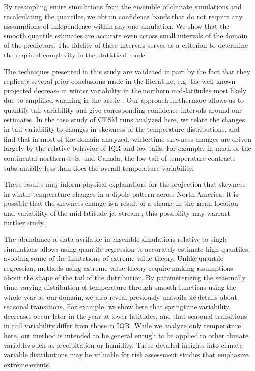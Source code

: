 \documentclass{ametsoc}
\begin{document}
By resampling entire simulations from the ensemble of climate simulations and recalculating the quantiles, we obtain confidence bands that do not require any assumptions of independence within any one simulation. We show that the smooth quantile estimates are accurate even across small intervals of the domain of the predictors. The fidelity of these intervals serves as a criterion to determine the required complexity in the statistical model.

The techniques presented in this study are validated in part by the fact that they replicate several prior conclusions made in the literature, e.g. the well-known projected decrease in winter variability in the northern mid-latitudes \citep[e.g.][]{schneider2015physics} most likely due to amplified warming in the arctic \citep{screen2014arctic}. Our approach furthermore allows us to quantify tail variability and give corresponding confidence intervals around our estimates. In the case study of CESM runs analyzed here, we relate the changes in tail variability to changes in skewness of the temperature distributions, and find that in most of the domain analyzed, wintertime skewness changes are driven largely by the relative behavior of IQR and low tails. For example, in much of the continental northern U.S.\ and Canada, the low tail of temperature contracts substantially less than does the overall temperature variability. 

These results may inform physical explanations for 
the projection that skewness in winter temperature changes in a dipole pattern across North America. It is possible that the skewness change is a result of a change in the mean location and variability of the mid-latitude jet stream \citep[e.g.][]{barnes2013response}; this possibility may warrant further study.

The abundance of data available in ensemble simulations relative to single simulations allows using quantile regression to accurately estimate high quantiles, avoiding some of the limitations of extreme value theory. Unlike quantile regression, methods using extreme value theory require making assumptions about the shape of the tail of the distribution. By parameterizing the seasonally time-varying distribution of temperature through smooth functions using the whole year as our domain, we also reveal previously unavailable details  about seasonal transitions. For example, we show here that springtime variability decreases occur later in the year at lower latitudes, and that seasonal transitions in tail variability differ from those in IQR.  While we analyze only temperature here, our method is intended to be general enough to be applied to other climate variables such as precipitation or humidity.
These detailed insights into climate variable distributions may be valuable for risk assessment studies that emphasize extreme events.
\end{document}
